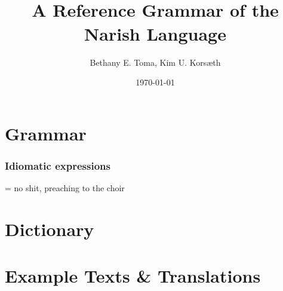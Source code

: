 \documentclass[a4paper,10pt,twoside,openright]{memoir}
\title{{\fontsize{100}{100}\selectfont \lang} \\ \Huge \sffamily A Reference Grammar of the Narish Language}
\author{Bethany E. Toma, Kim U. Korsæth}
\date{\today}
\begin{document}
\begin{titlingpage}
    \maketitle
\end{titlingpage}

\frontmatter



\newpage

\tableofcontents

\mainmatter

\part{Grammar}









\section{Idiomatic expressions}

 = no shit, preaching to the choir

\part{Dictionary}



\part{Example Texts \& Translations}

%
\end{document}
